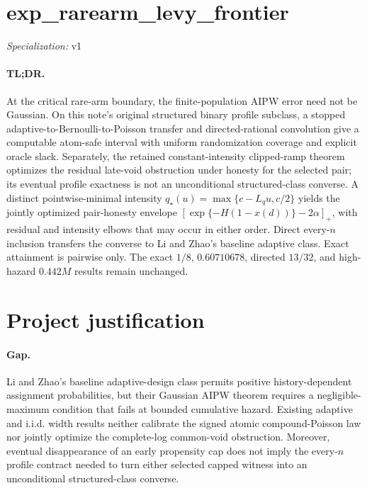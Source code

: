 \documentclass{article}
\begin{document}
\sloppy

\section*{exp\_\allowbreak{}rarearm\_\allowbreak{}levy\_\allowbreak{}frontier}

\noindent\textit{Specialization:} v1\par

\paragraph{TL;DR.} At the critical rare-arm boundary, the finite-population AIPW error need not be Gaussian. On this note's original structured binary profile subclass, a stopped adaptive-to-Bernoulli-to-Poisson transfer and directed-rational convolution give a computable atom-safe interval with uniform randomization coverage and explicit oracle slack. Separately, the retained constant-intensity clipped-ramp theorem optimizes the residual late-void obstruction under honesty for the selected pair; its eventual profile exactness is not an unconditional structured-class converse. A distinct pointwise-minimal intensity \(q_\star(u)=\max\{c-L_qu,c/2\}\) yields the jointly optimized pair-honesty envelope \(\left[\exp\{-H(1-x(d))\}-2\alpha\right]_+\), with residual and intensity elbows that may occur in either order. Direct every-\(n\) inclusion transfers the converse to Li and Zhao's baseline adaptive class. Exact attainment is pairwise only. The exact \(1/8\), \(0.60710678\), directed \(13/32\), and high-hazard \(0.442M\) results remain unchanged.

\section{Project justification}

\paragraph{Gap.} Li and Zhao's baseline adaptive-design class permits positive history-dependent assignment probabilities, but their Gaussian AIPW theorem requires a negligible-maximum condition that fails at bounded cumulative hazard. Existing adaptive and i.i.d. width results neither calibrate the signed atomic compound-Poisson law nor jointly optimize the complete-log common-void obstruction. Moreover, eventual disappearance of an early propensity cap does not imply the every-\(n\) profile contract needed to turn either selected capped witness into an unconditional structured-class converse.
\end{document}
